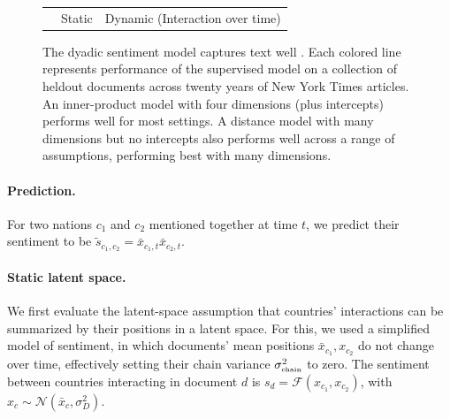 \begin{figure}
\begin{tabular}{m{2cm}cc}
  \\ & Static & Dynamic (Interaction over time) \\
\end{tabular}
  \label{figure:fr_supervised_performance}
   \caption{The dyadic sentiment model captures text well . Each
     colored line represents performance of the supervised model on a collection
     of heldout documents across twenty years of New York Times
     articles. An inner-product model with four dimensions (plus
     intercepts) performs well for most settings.  A distance model
     with many dimensions but no intercepts also performs well across
     a range of assumptions, performing best with many dimensions.}
\end{figure}

\paragraph{Prediction.}
For two nations $c_1$ and $c_2$ mentioned together at time $t$, we
predict their sentiment to be $\tilde s_{c_1, c_2} = \bar x_{c_1,t} \bar x_{c_2, t}$.

\paragraph{Static latent space.}
We first evaluate the latent-space assumption that countries'
interactions can be summarized by their positions in a latent space.
For this, we used a simplified model of sentiment, in which documents'
mean positions $\bar x_{c_1}, x_{c_2}$ do not change over time,
effectively setting their chain variance $\sigma_{\mbox{\tiny
    chain}}^2$ to zero.  The
sentiment between countries interacting in document $d$ is $s_d =
\mathcal{F}(x_{c_1}, x_{c_2})$, with $x_c \sim \mathcal{N}(\bar x_c,
\sigma_D^2)$.

